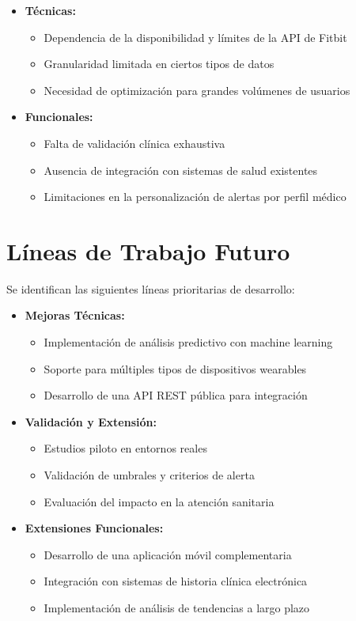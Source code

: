\begin{itemize}
    \item \textbf{Técnicas:}
        \begin{itemize}
            \item Dependencia de la disponibilidad y límites de la API de Fitbit\textsuperscript{\textregistered}
            \item Granularidad limitada en ciertos tipos de datos
            \item Necesidad de optimización para grandes volúmenes de usuarios
        \end{itemize}
    \item \textbf{Funcionales:}
        \begin{itemize}
            \item Falta de validación clínica exhaustiva
            \item Ausencia de integración con sistemas de salud existentes
            \item Limitaciones en la personalización de alertas por perfil médico
        \end{itemize}
\end{itemize}

\section{Líneas de Trabajo Futuro}
\label{sec:trabajo_futuro}

Se identifican las siguientes líneas prioritarias de desarrollo:

\begin{itemize}
    \item \textbf{Mejoras Técnicas:}
        \begin{itemize}
            \item Implementación de análisis predictivo con machine learning
            \item Soporte para múltiples tipos de dispositivos wearables
            \item Desarrollo de una API REST pública para integración
        \end{itemize}
    \item \textbf{Validación y Extensión:}
        \begin{itemize}
            \item Estudios piloto en entornos reales
            \item Validación de umbrales y criterios de alerta
            \item Evaluación del impacto en la atención sanitaria
        \end{itemize}
    \item \textbf{Extensiones Funcionales:}
        \begin{itemize}
            \item Desarrollo de una aplicación móvil complementaria
            \item Integración con sistemas de historia clínica electrónica
            \item Implementación de análisis de tendencias a largo plazo
        \end{itemize}
\end{itemize}

